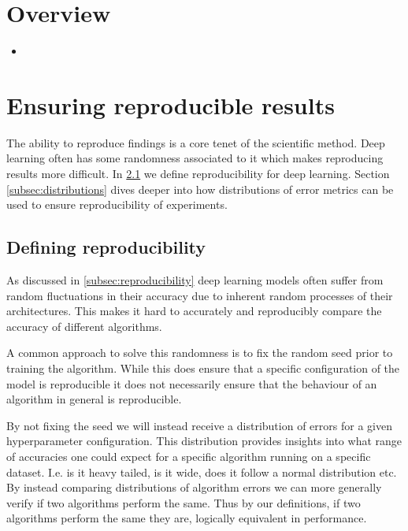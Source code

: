 

\section{Overview}
\begin{itemize}
\item 
\end{itemize}


\section{Ensuring reproducible results}
\label{"sec:reproducibility"}
The ability to reproduce findings is a core tenet of the scientific method. Deep learning often has some randomness associated to it which makes reproducing results more difficult. In \ref{subsec:defining_reproducibility} we define reproducibility for deep learning. Section \ref{subsec:distributions} dives deeper into how distributions of error metrics can be used to ensure reproducibility of experiments.

\subsection{Defining reproducibility}
\label{subsec:defining_reproducibility}
As discussed in \ref{subsec:reproducibility} deep learning models often suffer from random fluctuations in their accuracy due to inherent random processes of their architectures. This makes it hard to accurately and reproducibly compare the accuracy of different algorithms. 

A common approach to solve this randomness is to fix the random seed prior to training the algorithm. While this does ensure that a specific configuration of the model is reproducible it does not necessarily ensure that the behaviour of an algorithm in general is reproducible.

By not fixing the seed we will instead receive a distribution of errors for a given hyperparameter configuration. This distribution provides insights into what range of accuracies one could expect for a specific algorithm running on a specific dataset. I.e. is it heavy tailed, is it wide, does it follow a normal distribution etc. By instead comparing distributions of algorithm errors we can more generally verify if two algorithms perform the same. Thus by our definitions, if two algorithms perform the same they are, logically equivalent in performance. 

